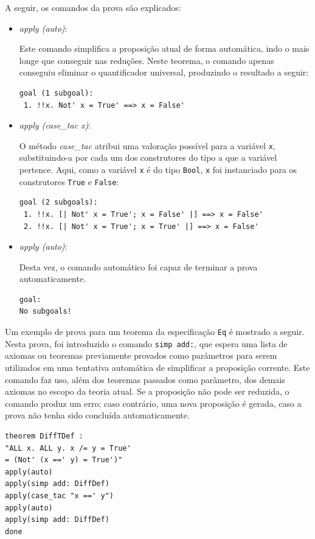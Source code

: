 A seguir, os comandos da prova são explicados:
\begin{itemize}
\item \textit{apply (auto)}:

Este comando simplifica a proposição atual de forma automática, indo o mais longe que conseguir nas reduções.
Neste teorema, o comando apenas conseguiu eliminar o quantificador universal, produzindo o resultado a seguir:

\begin{Verbatim}
goal (1 subgoal):
 1. !!x. Not' x = True' ==> x = False'
\end{Verbatim}

\item \textit{apply (case\_tac x)}:

O método \textit{case\_tac} atribui uma valoração possível para a variável \Verb.x., substituindo-a por cada um dos construtores do tipo a que a variável pertence.
Aqui, como a variável \Verb.x. é do tipo \Verb.Bool., \Verb.x. foi instanciado para os construtores \Verb.True. e \Verb.False.:

\begin{Verbatim}
goal (2 subgoals):
 1. !!x. [| Not' x = True'; x = False' |] ==> x = False'
 2. !!x. [| Not' x = True'; x = True' |] ==> x = False'
\end{Verbatim}

\item \textit{apply (auto)}:

Desta vez, o comando automático foi capaz de terminar a prova automaticamente.

\begin{Verbatim}
goal:
No subgoals!
\end{Verbatim}

\end{itemize}

Um exemplo de prova para um teorema da especificação \Verb.Eq. é mostrado a seguir.
Nesta prova, foi introduzido o comando \Verb.simp add:., que espera uma lista de axiomas ou teoremas previamente provados como parâmetros para serem utilizados em uma tentativa automática de simplificar a proposição corrente.
Este comando faz uso, além dos teoremas passados como parâmetro, dos demais axiomas no escopo da teoria atual.
Se a proposição não pode ser reduzida, o comando produz um erro; caso contrário, uma nova proposição é gerada, caso a prova não tenha sido concluída automaticamente.

\begin{Verbatim}
theorem DiffTDef :
"ALL x. ALL y. x /= y = True' 
= (Not' (x ==' y) = True')"
apply(auto)
apply(simp add: DiffDef)
apply(case_tac "x ==' y")
apply(auto)
apply(simp add: DiffDef)
done
\end{Verbatim}

